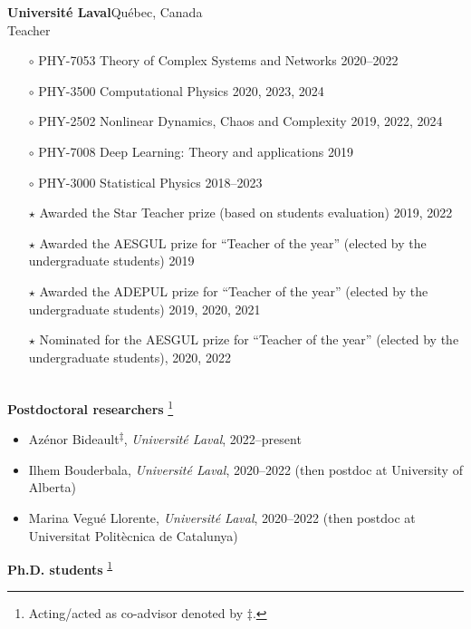 \documentclass[11pt]{article}
\newcommand{\TitreSection}[1]{\colorbox{background}{\makebox[\textwidth-0.5em][c]{\Large\textrm{\textsc{#1}}}}\vspace{0.75\baselineskip}\\}
\begin{document}
%
\textbf{Universit\'e Laval}\hfill Qu\'ebec, Canada\\
Teacher
\begin{itemize}[leftmargin=1.5em]\small
  \item[$\circ$] PHY-7053 Theory of Complex Systems and Networks \hfill 2020--2022%
  \item[$\circ$] PHY-3500 Computational Physics \hfill 2020, 2023, 2024%
  \item[$\circ$] PHY-2502 Nonlinear Dynamics, Chaos and Complexity \hfill 2019, 2022, 2024%
  \item[$\circ$] PHY-7008 Deep Learning: Theory and applications \hfill 2019%
  \item[$\circ$] PHY-3000 Statistical Physics \hfill 2018--2023%
  \item[$\star$] Awarded the Star Teacher prize (based on students evaluation) 2019, 2022
  \item[$\star$] Awarded the AESGUL prize for ``Teacher of the year'' (elected by the undergraduate students) 2019
  \item[$\star$] Awarded the ADEPUL prize for ``Teacher of the year'' (elected by the undergraduate students) 2019, 2020, 2021
  \item[$\star$] Nominated for the AESGUL prize for ``Teacher of the year'' (elected by the undergraduate students), 2020, 2022
\end{itemize} \vspace{0.75\baselineskip}
%
%
%
%
%
\TitreSection{Mentoring}
%
\textbf{Postdoctoral researchers}%
%
\footnote{\label{foot:codirecteur}Acting/acted as co-advisor denoted by $\ddagger$.}
%
\begin{itemize}
  \item Azénor Bideault\textsuperscript{$\ddagger$}, \textit{Universit\'e Laval}, 2022--present
  \item Ilhem Bouderbala, \textit{Universit\'e Laval}, 2020--2022  {\small(then postdoc at University of Alberta)}
  \item Marina Vegué Llorente, \textit{Université Laval}, 2020--2022 {\small(then postdoc at Universitat Politècnica de Catalunya)}
\end{itemize}
%
%
%
\textbf{Ph.D. students}%
\textsuperscript{\ref{foot:codirecteur}}%
\end{document}
